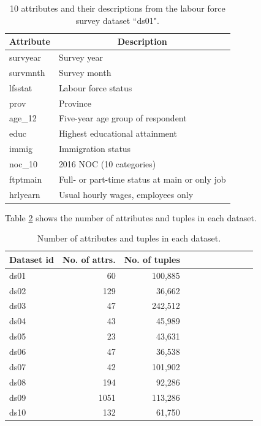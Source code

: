 \begin{table}[t]
	\centering
	\begin{tabular}{|l|l|}
		\hline
		\multicolumn{1}{|c|}{\textbf{Attribute}} & \multicolumn{1}{c|}{\textbf{Description}}     \\ \hline
		survyear & Survey year                        \\
		survmnth & Survey month                       \\
		lfsstat  & Labour force status                \\
		prov     & Province                           \\
		age\_12  & Five-year age group of respondent  \\
		educ     & Highest educational attainment     \\
		immig    & Immigration status                 \\
		noc\_10  & 2016 NOC (10 categories)           \\
		ftptmain                                 & Full- or part-time status at main or only job \\
		hrlyearn & Usual hourly wages, employees only \\ \hline
	\end{tabular}
	\caption{10 attributes and their descriptions from the labour force survey dataset ``ds01".}
	\label{tab:ds01_attrs_samples}
\end{table}
Table \ref{table:ds_stats} shows the number of attributes and tuples in each dataset.
\begin{table}[t]
	\centering
	\begin{tabular}{ |l|r|r|r|r|r|r|r|r|r|r| }
		\hline
		\textbf{Dataset id} & \textbf{No. of attrs.} & \textbf{No. of tuples} \\
		\hline
		ds01 & 60 & 100,885 \\
		ds02 & 129 & 36,662 \\
		ds03 & 47 & 242,512 \\
		ds04 & 43 & 45,989 \\
		ds05 & 23 & 43,631 \\
		ds06 & 47 & 36,538 \\
		ds07 & 42 & 101,902 \\
		ds08 & 194 & 92,286 \\
		ds09 & 1051 & 113,286 \\
		ds10 & 132 & 61,750 \\
		\hline
	\end{tabular}
	\caption{Number of attributes and tuples in each dataset.}
	\label{table:ds_stats}
\end{table}

